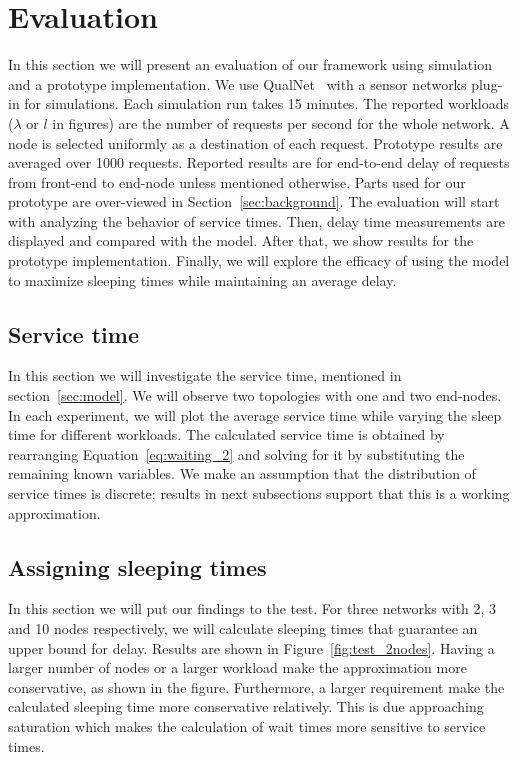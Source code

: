 \section{Evaluation}

In this section we will present an evaluation of our framework using simulation and a prototype implementation. We use QualNet~\cite{16} with a sensor networks plug-in for simulations. Each simulation run takes 15 minutes. The reported workloads ($\lambda$ or $l$ in figures) are the number of requests per second for the whole network. A node is selected uniformly as a destination of each request. Prototype results are averaged over 1000 requests. Reported results are for end-to-end delay of requests from front-end to end-node unless mentioned otherwise. Parts used for our prototype are over-viewed in Section~\ref{sec:background}. The evaluation will start with analyzing the behavior of service times. Then, delay time measurements are displayed and compared with the model. After that, we show results for the prototype implementation. Finally, we will explore the efficacy of using the model to maximize sleeping times while maintaining an average delay.

\subsection{Service time}
In this section we will investigate the service time, mentioned in section~\ref{sec:model}. We will observe two topologies with one and two end-nodes. In each experiment, we will plot the average service time while varying the sleep time for different workloads. The calculated service time is obtained by rearranging Equation~\ref{eq:waiting_2} and solving for it by substituting the remaining known variables. We make an assumption that the distribution of service times is discrete; results in next subsections support that this is a working approximation. 



\subsection{Assigning sleeping times}
In this section we will put our findings to the test. For three networks with 2, 3 and 10 nodes respectively, we will calculate sleeping times that guarantee an upper bound for delay. Results are shown in Figure~\ref{fig:test_2nodes}. Having a larger number of nodes or a larger workload make the approximation more conservative, as shown in the figure. Furthermore, a larger requirement make the calculated sleeping time more conservative relatively. This is due approaching saturation which makes the calculation of wait times more sensitive to service times.



